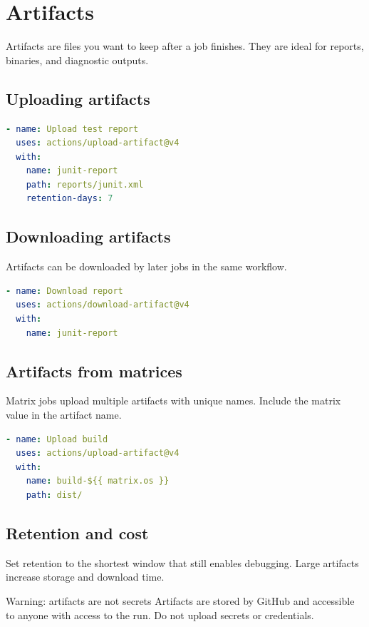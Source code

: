 \chapter{Artifacts}

Artifacts are files you want to keep after a job finishes.
They are ideal for reports, binaries, and diagnostic outputs.

\section{Uploading artifacts}
\begin{lstlisting}[language=YAML]
- name: Upload test report
  uses: actions/upload-artifact@v4
  with:
    name: junit-report
    path: reports/junit.xml
    retention-days: 7
\end{lstlisting}

\section{Downloading artifacts}
Artifacts can be downloaded by later jobs in the same workflow.

\begin{lstlisting}[language=YAML]
- name: Download report
  uses: actions/download-artifact@v4
  with:
    name: junit-report
\end{lstlisting}

\section{Artifacts from matrices}
Matrix jobs upload multiple artifacts with unique names.
Include the matrix value in the artifact name.

\begin{lstlisting}[language=YAML]
- name: Upload build
  uses: actions/upload-artifact@v4
  with:
    name: build-${{ matrix.os }}
    path: dist/
\end{lstlisting}

\section{Retention and cost}
Set retention to the shortest window that still enables debugging.
Large artifacts increase storage and download time.

\begin{warningbox}{Warning: artifacts are not secrets}
Artifacts are stored by GitHub and accessible to anyone with access to the run.
Do not upload secrets or credentials.
\end{warningbox}

